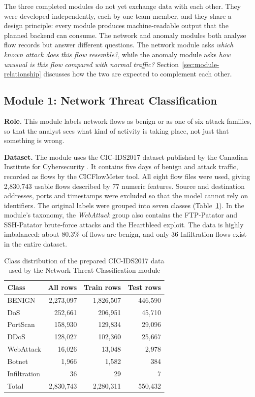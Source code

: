 The three completed modules do not yet exchange data with each other. They were developed independently, each by one team member, and they share a design principle: every module produces machine-readable output that the planned backend can consume. The network and anomaly modules both analyse flow records but answer different questions. The network module asks \textit{which known attack does this flow resemble?}, while the anomaly module asks \textit{how unusual is this flow compared with normal traffic?} Section~\ref{sec:module-relationship} discusses how the two are expected to complement each other.

\subsection{Module 1: Network Threat Classification}

\textbf{Role.} This module labels network flows as benign or as one of six attack families, so that the analyst sees what kind of activity is taking place, not just that something is wrong.

\textbf{Dataset.} The module uses the CIC-IDS2017 dataset published by the Canadian Institute for Cybersecurity \cite{sharafaldin2018cicids,cicids2017web}. It contains five days of benign and attack traffic, recorded as flows by the CICFlowMeter tool. All eight flow files were used, giving 2,830,743 usable flows described by 77 numeric features. Source and destination addresses, ports and timestamps were excluded so that the model cannot rely on identifiers. The original labels were grouped into seven classes (Table~\ref{tab:ntc-data}). In the module's taxonomy, the \textit{WebAttack} group also contains the FTP-Patator and SSH-Patator brute-force attacks and the Heartbleed exploit. The data is highly imbalanced: about 80.3\% of flows are benign, and only 36 Infiltration flows exist in the entire dataset.

\begin{table}[H]
\centering
\caption{Class distribution of the prepared CIC-IDS2017 data used by the Network Threat Classification module}
\label{tab:ntc-data}
\small
\begin{tabular}{lrrr}
\toprule
\textbf{Class} & \textbf{All rows} & \textbf{Train rows} & \textbf{Test rows} \\
\midrule
BENIGN       & 2,273,097 & 1,826,507 & 446,590 \\
DoS          &   252,661 &   206,951 &  45,710 \\
PortScan     &   158,930 &   129,834 &  29,096 \\
DDoS         &   128,027 &   102,360 &  25,667 \\
WebAttack    &    16,026 &    13,048 &   2,978 \\
Botnet       &     1,966 &     1,582 &     384 \\
Infiltration &        36 &        29 &       7 \\
\midrule
Total        & 2,830,743 & 2,280,311 & 550,432 \\
\bottomrule
\end{tabular}
\end{table}

